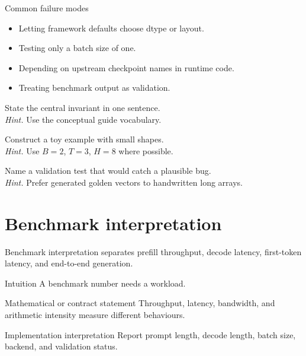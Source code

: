 \begin{warningbox}{Common failure modes}
\begin{itemize}
\item Letting framework defaults choose dtype or layout.
\item Testing only a batch size of one.
\item Depending on upstream checkpoint names in runtime code.
\item Treating benchmark output as validation.
\end{itemize}
\end{warningbox}

\begin{chapterexercises}
\item State the central invariant in one sentence.\\
\textit{Hint.} Use the conceptual guide vocabulary.
\item Construct a toy example with small shapes.\\
\textit{Hint.} Use $B=2$, $T=3$, $H=8$ where possible.
\item Name a validation test that would catch a plausible bug.\\
\textit{Hint.} Prefer generated golden vectors to handwritten long arrays.
\end{chapterexercises}

\chapter{Benchmark interpretation}
\label{ch:benchmark-interpretation}
Benchmark interpretation separates prefill throughput, decode latency, first-token latency, and end-to-end generation.



\begin{intuitionbox}{Intuition}
A benchmark number needs a workload.
\end{intuitionbox}

\begin{definitionbox}{Mathematical or contract statement}
Throughput, latency, bandwidth, and arithmetic intensity measure different behaviours.
\end{definitionbox}

\begin{implementationbox}{Implementation interpretation}
Report prompt length, decode length, batch size, backend, and validation status.
\end{implementationbox}

